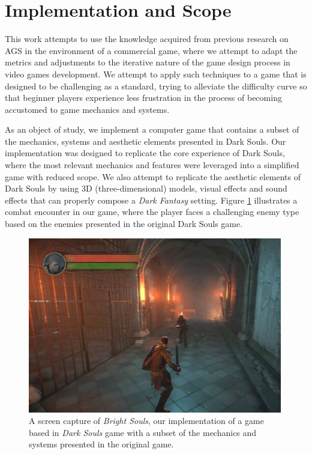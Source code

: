 
\section{Implementation and Scope}

This work attempts to use the knowledge acquired from previous research on AGS in the environment of a commercial game, where we attempt to adapt the metrics and adjustments to the iterative nature of the game design process in video games development. We attempt to apply such techniques to a game that is designed to be challenging as a standard, trying to alleviate the difficulty curve so that beginner players experience less frustration in the process of becoming accustomed to game mechanics and systems.

As an object of study, we implement a computer game that contains a subset of the mechanics, systems and aesthetic elements presented in Dark Souls. Our implementation was designed to replicate the core experience of Dark Souls, where the most relevant mechanics and features were leveraged into a simplified game with reduced scope. We also attempt to replicate the aesthetic elements of Dark Souls by using 3D (three-dimensional) models, visual effects and sound effects that can properly compose a \emph{Dark Fantasy} setting. Figure \ref{fig:implementation-bright-souls} illustrates a combat encounter in our game, where the player faces a challenging enemy type based on the enemies presented in the original Dark Souls game.

\begin{figure}[!ht]
    \caption{A screen capture of \emph{Bright Souls}, our implementation of a game based in \emph{Dark Souls} game with a subset of the mechanics and systems presented in the original game.}
    \begin{center}
        \includegraphics[width=30em]{figures/fig-bright-souls.jpg}
    \end{center}
    \label{fig:implementation-bright-souls}
\end{figure}

